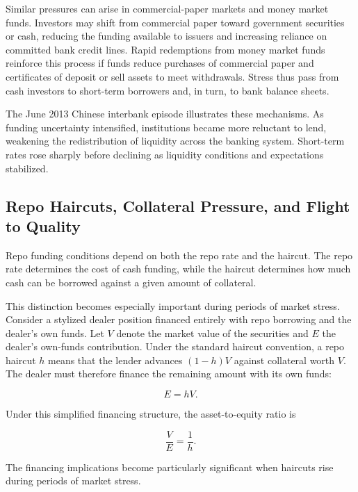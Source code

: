 Similar pressures can arise in commercial-paper markets and money market funds. Investors may shift from commercial paper toward government securities or cash, reducing the funding available to issuers and increasing reliance on committed bank credit lines. Rapid redemptions from money market funds reinforce this process if funds reduce purchases of commercial paper and certificates of deposit or sell assets to meet withdrawals. Stress thus pass from cash investors to short-term borrowers and, in turn, to bank balance sheets.

The June 2013 Chinese interbank episode illustrates these
mechanisms. As funding uncertainty intensified,
institutions became more reluctant to lend, weakening
the redistribution of liquidity across the banking
system. Short-term rates rose sharply before declining
as liquidity conditions and expectations stabilized.

\subsection{Repo Haircuts, Collateral Pressure, and Flight to Quality}

Repo funding conditions depend on both the repo rate and the haircut. The repo rate determines the cost of cash funding, while the haircut determines how much cash can be borrowed against a given amount of collateral.

This distinction becomes especially important during
periods of market stress. Consider a stylized dealer
position financed entirely with repo borrowing and
the dealer's own funds. Let $V$ denote the market
value of the securities and $E$ the dealer's own-funds
contribution. Under the standard haircut convention,
a repo haircut $h$ means that the lender advances
$(1-h)V$ against collateral worth $V$. The dealer
must therefore finance the remaining amount with
its own funds:

\begin{equation*}
E=hV.
\label{eq:ch7-haircut-equity}
\end{equation*}

Under this simplified financing structure, the asset-to-equity ratio is

\begin{equation*}
\frac{V}{E}=\frac{1}{h}.
\label{eq:ch7-haircut-leverage}
\end{equation*}

The financing implications become particularly
significant when haircuts rise during periods of
market stress.

